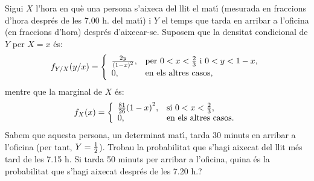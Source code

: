 \begin{probres}
{Sigui $X$ l'hora en qu\`e una persona s'aixeca del llit el mat\'{\i}
(mesurada en fraccions d'hora despr\'es de les 7.00 h. del mat\'{\i}) i $Y$
el temps
que tarda en arribar a l'oficina (en fraccions d'hora) despr\'es d'aixecar-se.
Suposem que la densitat condicional de $Y$ per $X=x$ \'es:
$$f_{Y/X}(y/x)=
\left\{\begin{array}{ll}
{2y\over {(1-x)}^2}, & \text{per $0<x<{2\over 3}$ i
$0<y<1-x$},\\
0, & \text{en els altres casos,}
\end{array}\right.
$$mentre que la marginal de $X$ \'es:
$$f_X (x)=
\left\{\begin{array}{ll}
{81\over 26}{(1-x)}^2, & \text{si $0<x<{2\over 3}$},\\
0, & \text{en
els altres casos.}
\end{array}\right.
$$Sabem que aquesta persona, un determinat mat\'{\i}, tarda 30
minuts en arribar a l'oficina (per tant, \hbox{$Y={1\over 2}$)}. Trobau la
probabilitat que s'hagi aixecat del llit m\'es tard de les 7.15 h.
 Si tarda 50 minuts per arribar a l'oficina, quina \'es la probabilitat que
s'hagi aixecat despr\'es de les 7.20 h.?}
\end{probres}

